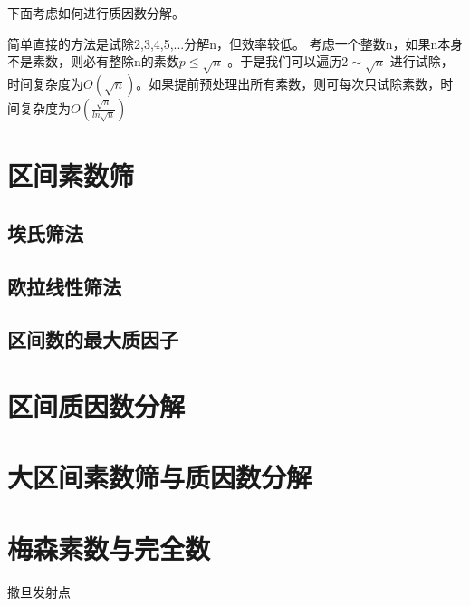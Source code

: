 \vbox{}

下面考虑如何进行质因数分解。

简单直接的方法是试除2,3,4,5,...分解n，但效率较低。
考虑一个整数n，如果n本身不是素数，则必有整除n的素数$p\leqslant \sqrt{n}$ 。于是我们可以遍历$2\sim \sqrt{n}$
进行试除，时间复杂度为$O(\sqrt{n})$。如果提前预处理出所有素数，则可每次只试除素数，时间复杂度为$O(\frac{\sqrt{n}}{ln \sqrt{n}})$



\section{区间素数筛}
\subsection{埃氏筛法}

\subsection{欧拉线性筛法}

\subsection{区间数的最大质因子}



\section{区间质因数分解}

\section{大区间素数筛与质因数分解}

\section{梅森素数与完全数}


\vbox{}

\begin{problemset}
	\item 撒旦发射点
	\item 
\end{problemset}